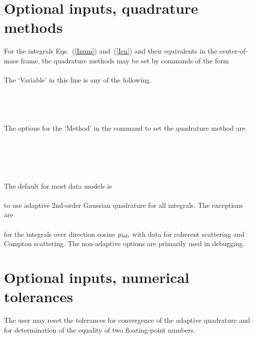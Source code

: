 \section{Optional inputs, quadrature methods}\label{Sec:QuadratureMethods}
For the integrals Eqs.~(\ref{Inum}) and~(\ref{Ien}) and their equivalents
in the center-of-mass frame, the quadrature methods may be set
by commands of the form\\
  \\
The `Variable' in this line is any of the following.\\
  \\
  \\
  \\
  \\
The options for the `Method' in the command to set the quadrature method
are\\
  \\
  \\
  \\
  \\
  \\
The default for most data models is\\
  \\
to use adaptive 2nd-order Gaussian  quadrature for all integrals.
The exceptions are\\
  \\
for the integrals over direction cosine $\mu_{\text{lab}}$ with data for
coherent scattering and Compton scattering.  The non-adaptive options
are primarily used in debugging.

\section{Optional inputs, numerical tolerances}
The user may reset the tolerances for convergence of the adaptive quadrature
and for determination of the equality of two floating-point numbers.

